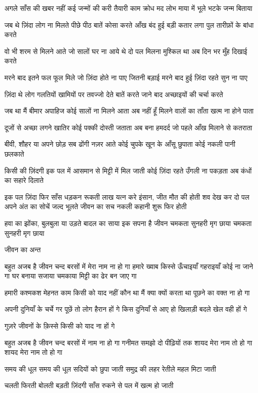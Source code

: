 अगले साँस की खबर नहीं
कई जन्मों की करी तैयारी
काम क्रोध मद लोभ माया में
भूले भटके जन्म बिताया


जब थे ज़िंदा लोग ना मिलते
पीछे पीठ बातें कोसा करते
आँख बंद हुई बड़ी कतार लगा
पुल तारीफ़ों के बांधा करते

वो भी शरम से मिलने आते
जो सालों घर ना आये थे
दो पल मिलना मुश्किल था
अब दिन भर मुँह दिखाई करते


मरने बाद इतने फल फूल मिले
जो ज़िंदा होते ना पाए
जितनी बड़ाई मरने बाद हुई
ज़िंदा रहते सुन ना पाए

ज़िंदा थे लोग गलतियों खामियों
पर तवज्जो देते बातें करते
जाने बाद अच्छाइयों की चर्चा करते



जब था मैं बीमार अपाहिज 
कोई सालों ना मिलने आता
अब नहीं हूँ मिलने वालों का
ताँता खत्म ना होने पाता

दूजों से अच्छा लगने खातिर
कोई पक्की दोस्ती जताता
अब बना हमदर्द जो पहले
आँख मिलाने से कतराता


बीवी, शौहर या अपने छोड़
सब ढोंगी नज़र आते
कोई चुपके खून के आँसू छुपाता
कोई नकली पानी छलकाते

किसी की ज़िंदगी इक पल में
आसमान से मिट्टी में मिल जाती
कोई ज़िंदा रहते उँगली ना पकड़ता
अब कंधों का सहारे दिलाते


इक पल ज़िंदा फिर साँस धड़कन रूकती
लाख यत्न करे इंसान, जीत मौत की होती
शव देख कर दो पल अपने अंत का सोचें
जल्द भूलते जीवन का सच
नकली कहानी शुरू फिर होती

हवा का झोंका, बुलबुला या
उड़ते बादल का साया
इक सपना है जीवन
चमकता सुनहरी मृग छाया
चमकता सुनहरी मृग छाया

जीवन का अन्त

बहुत अजब है जीवन
चन्द बरसों में मेरा नाम ना हो गा
हमारे ख्वाब किस्से ऊँचाइयाँ
गहराइयाँ कोई ना जाने गा 
घर बनाया सजाया चमकाया
मिट्टी का ढेर बन जाए गा

हमारी कश्मकश मेहनत काम
किसी को याद नहीं
कौन था मैं क्या क्यों करता था
पूछने का वक्त ना हो गा

अपनी दुनियाँ के चर्चे
गर पूछें तो लोग हैरान हों गे
किस दुनियाँ से आए हो
खिलाड़ी बदले खेल वही हों गे

गुज़रे जीवनों के क़िस्से
किसी को याद ना हों गे

बहुत अजब है जीवन
चन्द बरसों में नाम ना हो गा
गनीमत समझो दो पीढ़ियों तक
शायद मेरा नाम तो हो गा 
शायद मेरा नाम तो हो गा


समय की धूल
समय की धूल सदियों को छुपा जाती 
समुद्र की लहर रेतीले महल मिटा जाती 

चलती फिरती बोलती बड़ती ज़िंदगी
साँस रुकने से पल में खत्म हो जाती

